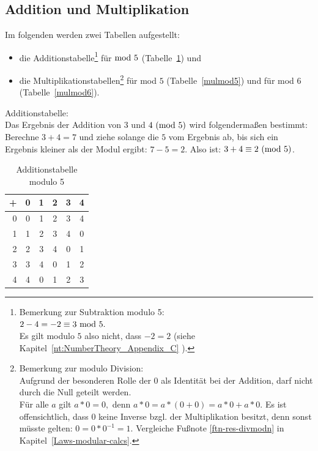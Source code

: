 \begin{refsegment}
\subsection{Addition und Multiplikation} 
\label{addmult}

Im folgenden werden zwei Tabellen aufgestellt:
\begin{itemize}

\item die Additionstabelle\footnote{%
      Bemerkung zur Subtraktion modulo 5:\\
      $2 - 4 = -2 \equiv 3{\rm ~mod~}5.$\\
      Es gilt modulo $5$ also nicht, dass $-2 = 2$
      (siehe Kapitel~\ref{nt:NumberTheory_Appendix_C}
      \glqq {}\grqq).
      }
für ${\rm mod~ } 5$ (Tabelle~\ref{addmod5}) und

\item die Multiplikationstabellen\footnote{\label{ftn-mod6}%
Bemerkung zur modulo Division:\\
Aufgrund der besonderen Rolle der $0$ als Identität bei der Addition,
darf nicht durch die Null geteilt werden.\\
Für alle $a$ gilt $a*0=0, $ denn $a*0 = a*(0+0) =a*0 + a*0.$ Es ist
offensichtlich, dass $0$ keine Inverse bzgl. der Multiplikation besitzt,
denn sonst müsste gelten: $0 = 0 * 0^{-1} = 1.$ Vergleiche Fußnote
\ref{ftn-res-divmodn} in Kapitel~\ref{Laws-modular-calcs}.  }
für mod $5$ (Tabelle~\ref{mulmod5}) und für mod $6$ (Tabelle~\ref{mulmod6}).

\end{itemize}


\begin{example}{ Additionstabelle:}\\
Das Ergebnis der Addition von $3$ und $4 {\rm ~(mod~ } 5)$ wird folgendermaßen
bestimmt:
Berechne $3 + 4 = 7$ und ziehe solange die $5$ vom Ergebnis ab, bis sich ein
Ergebnis kleiner als der Modul ergibt: $7 - 5 = 2$.
Also ist: $3 + 4 \equiv 2 {\rm ~(mod~ } 5)$.

\begin{table}[!ht]
\begin{center}
\begin{tabular}{r|ccccc}
+ &  0 & 1 & 2 & 3 & 4\\
\hline
0 &  0 & 1 & 2 & 3 & 4\\
1 & 1 &  2 & 3 & 4 & 0\\
2 & 2 & 3 & 4 & 0 & 1\\
3 & 3 & 4 & 0 & 1 & 2\\
4 & 4 & 0 & 1 & 2 & 3
\end{tabular}
\end{center}
\caption{Additionstabelle modulo 5}
\label{addmod5}
\end{table}
\end{example}


\end{refsegment}
